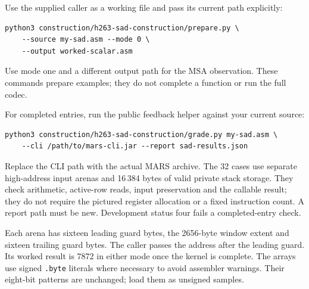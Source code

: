 Use the supplied caller as a working file and pass its current path explicitly:
\begin{verbatim}
python3 construction/h263-sad-construction/prepare.py \
    --source my-sad.asm --mode 0 \
    --output worked-scalar.asm
\end{verbatim}
Use mode one and a different output path for the MSA observation. These commands
prepare examples; they do not complete a function or run the full codec.

For completed entries, run the public feedback helper against your current source:
\begin{verbatim}
python3 construction/h263-sad-construction/grade.py my-sad.asm \
    --cli /path/to/mars-cli.jar --report sad-results.json
\end{verbatim}
Replace the CLI path with the actual MARS archive. The 32 cases use separate
high-address input arenas and 16\,384 bytes of valid private stack storage. They
check arithmetic, active-row reads, input preservation and the callable result;
they do not require the pictured register allocation or a fixed instruction count.
A report path must be new. Development status four fails a completed-entry check.

Each arena has sixteen leading guard bytes, the 2656-byte window extent and
sixteen trailing guard bytes. The caller passes the address after the leading
guard. Its worked result is 7872 in either mode once the kernel is complete.
The arrays use signed \texttt{.byte} literals where necessary to avoid assembler
warnings. Their eight-bit patterns are unchanged; load them as unsigned samples.
